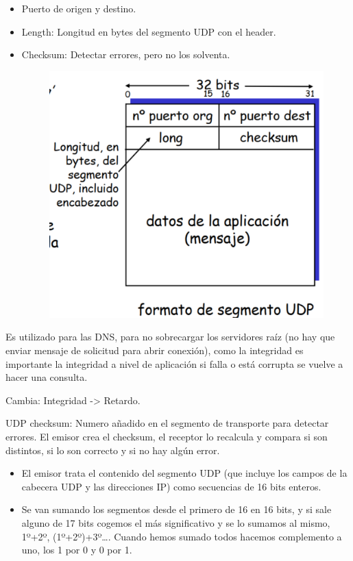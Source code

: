 \documentclass[12pt, twoside, openright]{report} %
\begin{document}
    \begin{itemize}
    \item
      Puerto de origen y destino.
    \item
      Length: Longitud en bytes del segmento UDP con el header.
    \item
      Checksum: Detectar errores, pero no los solventa.
	  \begin{figure}[H]
		{\includegraphics[scale=.45]{Untitled 8.png}}
	\end{figure}
    \end{itemize}

	Es utilizado para las DNS, para no sobrecargar los servidores raíz
    (no hay que enviar mensaje de solicitud para abrir conexión), como
    la integridad es importante la integridad a nivel de aplicación si
    falla o está corrupta se vuelve a hacer una consulta.

	Cambia: Integridad -\textgreater{} Retardo.

	UDP checksum: Numero añadido en el segmento de transporte para
    detectar errores. El emisor crea el checksum, el receptor lo
    recalcula y compara si son distintos, si lo son correcto y si no hay
    algún error.

    \begin{itemize}
    \item
      El emisor trata el contenido del segmento UDP (que incluye los
      campos de la cabecera UDP y las direcciones IP) como secuencias de
      16 bits enteros.
    \item
      Se van sumando los segmentos desde el primero de 16 en 16 bits, y
      si sale alguno de 17 bits cogemos el más significativo y se lo
      sumamos al mismo, 1º+2º, (1º+2º)+3º\ldots. Cuando hemos sumado
      todos hacemos complemento a uno, los 1 por 0 y 0 por 1.
    \end{itemize}
\pagebreak
\end{document}
